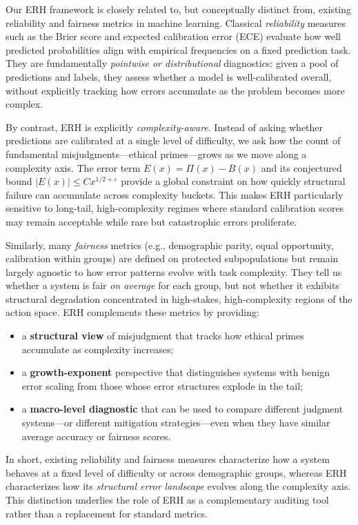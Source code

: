 \documentclass[12pt,a4paper]{article}
\theoremstyle{definition}
\theoremstyle{remark}
\begin{document}
Our ERH framework is closely related to, but conceptually distinct from, existing reliability and fairness metrics in machine learning.
Classical \emph{reliability} measures such as the Brier score and expected calibration error (ECE) evaluate how well predicted probabilities align with empirical frequencies on a fixed prediction task.
They are fundamentally \emph{pointwise or distributional} diagnostics: given a pool of predictions and labels, they assess whether a model is well-calibrated overall, without explicitly tracking how errors accumulate as the problem becomes more complex.

By contrast, ERH is explicitly \emph{complexity-aware}.
Instead of asking whether predictions are calibrated at a single level of difficulty, we ask how the count of fundamental misjudgments---ethical primes---grows as we move along a complexity axis.
The error term $E(x) = \Pi(x) - B(x)$ and its conjectured bound $|E(x)| \leq C x^{1/2+\varepsilon}$ provide a global constraint on how quickly structural failure can accumulate across complexity buckets.
This makes ERH particularly sensitive to long-tail, high-complexity regimes where standard calibration scores may remain acceptable while rare but catastrophic errors proliferate.

Similarly, many \emph{fairness} metrics (e.g., demographic parity, equal opportunity, calibration within groups) are defined on protected subpopulations but remain largely agnostic to how error patterns evolve with task complexity.
They tell us whether a system is fair \emph{on average} for each group, but not whether it exhibits structural degradation concentrated in high-stakes, high-complexity regions of the action space.
ERH complements these metrics by providing:
\begin{itemize}
    \item a \textbf{structural view} of misjudgment that tracks how ethical primes accumulate as complexity increases;
    \item a \textbf{growth-exponent} perspective that distinguishes systems with benign error scaling from those whose error structures explode in the tail;
    \item a \textbf{macro-level diagnostic} that can be used to compare different judgment systems---or different mitigation strategies---even when they have similar average accuracy or fairness scores.
\end{itemize}

In short, existing reliability and fairness measures characterize how a system behaves at a fixed level of difficulty or across demographic groups, whereas ERH characterizes how its \emph{structural error landscape} evolves along the complexity axis.
This distinction underlies the role of ERH as a complementary auditing tool rather than a replacement for standard metrics.
\end{document}
